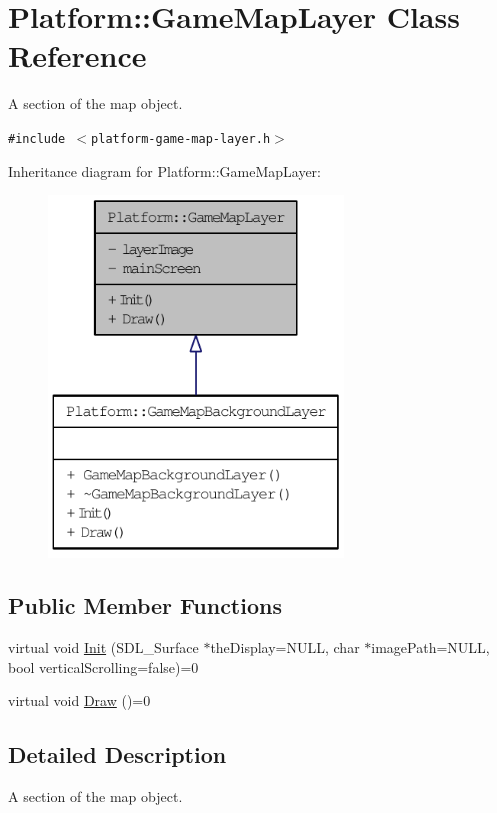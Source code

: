 \hypertarget{class_platform_1_1_game_map_layer}{
\section{Platform::GameMapLayer Class Reference}
\label{d8/d53/class_platform_1_1_game_map_layer}
}
A section of the map object.  


{\tt \#include $<$platform-game-map-layer.h$>$}

Inheritance diagram for Platform::GameMapLayer:\nopagebreak
\begin{figure}[H]
\begin{center}
\leavevmode
\includegraphics[width=222pt]{d8/dbc/class_platform_1_1_game_map_layer__inherit__graph}
\end{center}
\end{figure}
\subsection*{Public Member Functions}
\begin{CompactItemize}
\item 
virtual void \hyperlink{class_platform_1_1_game_map_layer_a25bd5a4d69574dfb3cefdd544e36e8d}{Init} (SDL\_\-Surface $\ast$theDisplay=NULL, char $\ast$imagePath=NULL, bool verticalScrolling=false)=0
\item 
virtual void \hyperlink{class_platform_1_1_game_map_layer_cc44f193d8cf01e97fe34cb7da72e640}{Draw} ()=0
\end{CompactItemize}


\subsection{Detailed Description}
A section of the map object. 

